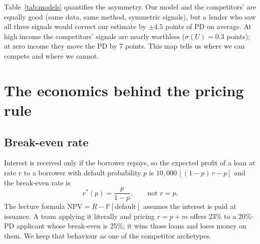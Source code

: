 \documentclass[11pt,a4paper]{article}
\newcommand{\Prob}{\mathbb{P}}
\begin{document}
Table~\ref{tab:models} quantifies the asymmetry. Our model and the competitors' are equally good (same data, same
method, symmetric signals), but a lender who saw all three signals would correct our estimate by $\pm 4.5$ points
of PD on average. At high income the competitors' signals are nearly worthless ($\sigma(U) = 0.3$ points); at zero
income they move the PD by 7 points. This map tells us where we can compete and where we cannot.

\section{The economics behind the pricing rule}

\subsection{Break-even rate}
Interest is received only if the borrower repays, so the expected profit of a loan at rate $r$ to a borrower with
default probability $p$ is $10{,}000\,[(1-p)\,r - p]$ and the break-even rate is
\begin{equation}
  r^*(p) = \frac{p}{1-p}, \qquad\text{not } r = p.
  \label{eq:breakeven}
\end{equation}
The lecture formula $\text{NPV} = R - \Prob[\text{default}]$ assumes the interest is paid at issuance. A team
applying it literally and pricing $r = p + m$ offers 23\% to a 20\%-PD applicant whose break-even is 25\%; it wins
those loans and loses money on them. We keep that behaviour as one of the competitor archetypes.
\end{document}
